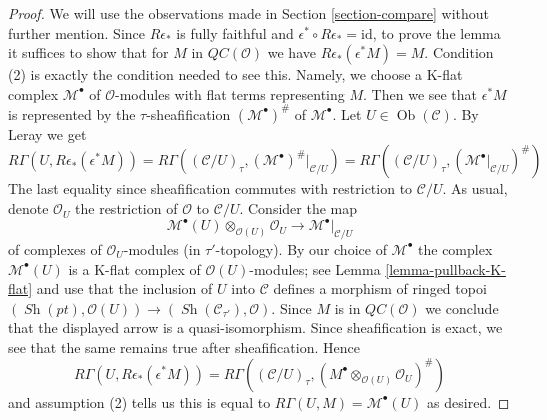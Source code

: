 \documentclass[10pt,a4paper]{amsart}
\theoremstyle{plain}
\theoremstyle{definition}
\theoremstyle{remark}
\numberwithin{equation}{subsection}
\def\Ob{\mathop{\mathrm{Ob}}\nolimits}
\def\Sh{\mathop{\mathit{Sh}}\nolimits}
\begin{document}
\begin{proof}
We will use the observations made in Section \ref{section-compare} without
further mention. Since $R\epsilon_*$
is fully faithful and $\epsilon^* \circ R\epsilon_* = \text{id}$,
to prove the lemma it suffices to show that for $M$ in
$\mathit{QC}(\mathcal{O})$ we have $R\epsilon_*(\epsilon^*M) = M$.
Condition (2) is exactly the condition needed to see this.
Namely, we choose a K-flat complex $\mathcal{M}^\bullet$
of $\mathcal{O}$-modules with flat terms representing $M$.
Then we see that $\epsilon^*M$ is represented by the $\tau$-sheafification
$(\mathcal{M}^\bullet)^\#$ of $\mathcal{M}^\bullet$.
Let $U \in \Ob(\mathcal{C})$. By Leray we get
$$
R\Gamma(U, R\epsilon_*(\epsilon^*M)) =
R\Gamma((\mathcal{C}/U)_\tau, (\mathcal{M}^\bullet)^\#|_{\mathcal{C}/U}) =
R\Gamma((\mathcal{C}/U)_\tau, (\mathcal{M}^\bullet|_{\mathcal{C}/U})^\#)
$$
The last equality since
sheafification commutes with restriction to $\mathcal{C}/U$.
As usual, denote $\mathcal{O}_U$ the restriction of $\mathcal{O}$ to
$\mathcal{C}/U$. Consider the map
$$
\mathcal{M}^\bullet(U) \otimes_{\mathcal{O}(U)} \mathcal{O}_U
\longrightarrow
\mathcal{M}^\bullet|_{\mathcal{C}/U}
$$
of complexes of $\mathcal{O}_U$-modules (in $\tau'$-topology).
By our choice of $\mathcal{M}^\bullet$ the complex $\mathcal{M}^\bullet(U)$
is a K-flat complex of $\mathcal{O}(U)$-modules; see
Lemma \ref{lemma-pullback-K-flat} and use that the inclusion
of $U$ into $\mathcal{C}$ defines a morphism of ringed topoi
$(\Sh(pt), \mathcal{O}(U)) \to (\Sh(\mathcal{C}_{\tau'}), \mathcal{O})$.
Since $M$ is in $\mathit{QC}(\mathcal{O})$ we conclude that
the displayed arrow is a quasi-isomorphism. Since sheafification
is exact, we see that the same remains true after sheafification.
Hence
$$
R\Gamma(U, R\epsilon_*(\epsilon^*M)) =
R\Gamma((\mathcal{C}/U)_\tau,
(M^\bullet \otimes_{\mathcal{O}(U)} \mathcal{O}_U)^\#)
$$
and assumption (2) tells us this is equal to
$R\Gamma(U, M) = \mathcal{M}^\bullet(U)$ as desired.
\end{proof}
\end{document}
